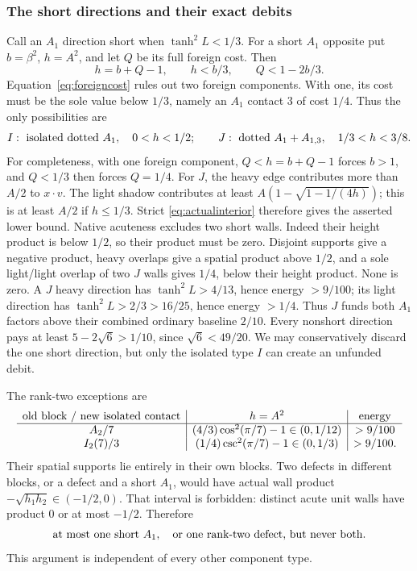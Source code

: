 \documentclass[11pt]{article}
\theoremstyle{remark}\newtheorem{remark}[theorem]{Remark}
\numberwithin{equation}{section}
\begin{document}
\subsubsection{The short directions and their exact debits}

Call an $A_1$ direction short when $\tanh^2L<1/3$.
For a short $A_1$ opposite put $b=\beta^2$, $h=A^2$, and let $Q$
be its full foreign cost. Then
 \[
 h=b+Q-1,\qquad h<b/3,\qquad Q<1-2b/3.
\]
Equation~\eqref{eq:foreigncost} rules out two foreign components.
With one, its cost must be the sole value below $1/3$, namely an
 $A_1$ contact $3$ of cost $1/4$. Thus the only possibilities are
 \[
 I:\ \hbox{isolated dotted }A_1,\quad 0<h<1/2;
 \qquad
 J:\ \hbox{dotted }A_1+A_{1,3},\quad 1/3<h<3/8.
\]
For completeness, with one foreign component,
$Q<h=b+Q-1$ forces $b>1$, and $Q<1/3$ then forces $Q=1/4$.
For $J$, the heavy edge contributes more than $A/2$ to
 $x\cdot v$. The light shadow contributes at least
 $A(1-\sqrt{1-1/(4h)})$; this is at least $A/2$ if $h\le1/3$.
Strict \eqref{eq:actualinterior} therefore gives the asserted lower bound.
Native acuteness excludes two short walls. Indeed their height
product is below $1/2$, so their product must be zero. Disjoint
supports give a negative product, heavy overlaps give a spatial
product above $1/2$, and a sole light/light overlap of two $J$ walls
gives $1/4$, below their height product. None is zero. A $J$ heavy
direction has $\tanh^2L>4/13$, hence energy $>9/100$; its light
direction has $\tanh^2L>2/3>16/25$, hence energy $>1/4$.
Thus $J$ funds both $A_1$ factors above their combined ordinary
baseline $2/10$. Every nonshort direction pays at least
 $5-2\sqrt6>1/10$, since $\sqrt6<49/20$. We may conservatively
discard the one short direction, but only the isolated type $I$
can create an unfunded debit.

The rank-two exceptions are
 \begin{equation}\label{compact:app:eq:defects}
\begin{array}{c|c|c}
\hbox{old block / new isolated contact} & h=A^2 & \hbox{energy}\\ \hline
A_2/7 & (4/3)\cos^2(\pi/7)-1\in(0,1/12) & >9/100\\
I_2(7)/3 & (1/4)\csc^2(\pi/7)-1\in(0,1/3) & >9/100.
\end{array}
\end{equation}
Their spatial supports lie entirely in their own blocks.
Two defects in different blocks, or a defect and a short $A_1$,
would have actual wall product $-\sqrt{h_1h_2}\in(-1/2,0)$.
That interval is forbidden: distinct acute unit walls have product
 $0$ or at most $-1/2$. Therefore
 \begin{equation}\label{compact:app:eq:debits}
\text{at most one short }A_1,\quad\hbox{or one rank-two defect,
but never both.}
\end{equation}
This argument is independent of every other component type.
\end{document}
